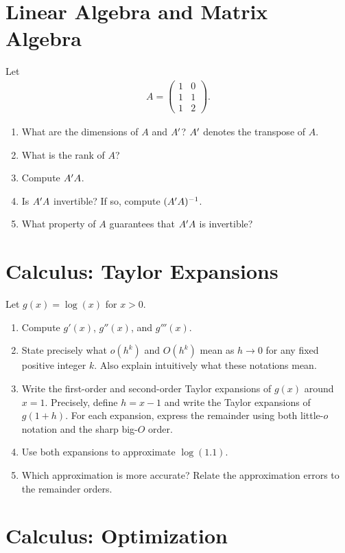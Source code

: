 \documentclass[letterpaper,12pt]{article}
\begin{document}
\section{Linear Algebra and Matrix Algebra}

Let
\begin{align}
	A=
	\begin{pmatrix}
		1 & 0 \\
		1 & 1 \\
		1 & 2
	\end{pmatrix}.
\end{align}

\begin{enumerate}
	\item
		What are the dimensions of $A$ and $A^{\prime}$? $A^{\prime}$ denotes the transpose of $A$.
	\item
		What is the rank of $A$?
	\item
		Compute $A^{\prime} A$.
	\item
		Is $A^{\prime} A$ invertible?
		If so, compute $(A^{\prime} A)^{-1}$.
	\item
		What property of $A$ guarantees that $A^{\prime} A$ is invertible?
\end{enumerate}

\section{Calculus: Taylor Expansions}

Let $g(x)=\log(x)$ for $x>0$.

\begin{enumerate}
	\item
		Compute $g'(x)$, $g''(x)$, and $g'''(x)$.
	\item
		State precisely what $o(h^k)$ and $O(h^k)$ mean as $h\to0$ for any fixed positive integer $k$.
		Also explain intuitively what these notations mean.
	\item
		Write the first-order and second-order Taylor expansions of $g(x)$ around $x=1$.
		Precisely, define $h=x-1$ and write the Taylor expansions of $g(1+h)$.
		For each expansion, express the remainder using both little-$o$ notation and the sharp big-$O$ order.
	\item
		Use both expansions to approximate $\log(1.1)$.
	\item
		Which approximation is more accurate?
		Relate the approximation errors to the remainder orders.
\end{enumerate}

\section{Calculus: Optimization}
\end{document}
